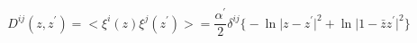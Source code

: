 \begin{equation}
D^{i j}(z,z^\prime)=<\xi^i(z)\xi^j(z^\prime)>=
\frac{\alpha^\prime}{2}\delta^{i j}\bigl\lbrace-\ln\vert
z-z^\prime\vert^2+\ln\vert 1-\bar zz^\prime\vert^2\bigr\rbrace
\end{equation}

